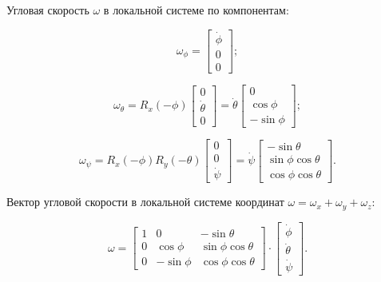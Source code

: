 Угловая скорость \(\omega\) в локальной системе по компонентам:

\begin{equation}
\omega_{\phi}=
\begin{bmatrix}
    \dot{\phi} \\
    0 \\
    0
\end{bmatrix};
\end{equation}

\begin{equation}
\omega_{\theta}=
R_x({-\phi}) \begin{bmatrix}
    0 \\
    \dot{\theta} \\
    0
    \end{bmatrix}=
    \dot{\theta}
    \begin{bmatrix}
        0 \\
        \cos \phi \\
        -\sin \phi
    \end{bmatrix};
\end{equation}

\begin{equation}
\omega_{\psi}=
R_x({-\phi}) R_y({-\theta}) \begin{bmatrix}
    0 \\
    0 \\
    \dot{\psi}
    \end{bmatrix}=
    \dot{\psi}
    \begin{bmatrix}
        -\sin \theta \\
        \sin \phi \cos \theta \\
        \cos \phi \cos \theta
    \end{bmatrix}.
\end{equation}


Вектор угловой скорости в локальной системе координат \(\omega=\omega_x+\omega_y+\omega_z\):

\begin{equation}
\omega=
\begin{bmatrix}
    1 & 0 & -\sin\theta \\
    0 & \cos\phi & \sin\phi\cos\theta \\
    0 &  -\sin\phi & \cos\phi\cos\theta
\end{bmatrix}
\cdot
\begin{bmatrix}
    \dot{\phi} \\
    \dot{\theta} \\
    \dot{\psi}
\end{bmatrix}.
\end{equation}


